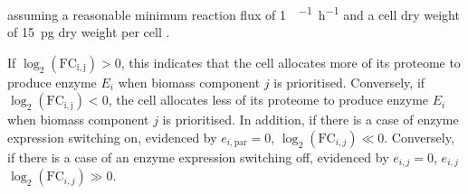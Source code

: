 assuming a reasonable minimum reaction flux of \SI{1}{\molecule~\cell^{-1}~\hour^{-1}} and a cell dry weight of \SI{15}{\pico\gram} dry weight per cell \parencite{shermanGettingStartedYeast2002}.

If $\log_{2}(\mathrm{FC_{i,j}}) > 0$, this indicates that the cell allocates more of its proteome to produce enzyme $E_{i}$ when biomass component $j$ is prioritised.
Conversely, if $\log_{2}(\mathrm{FC_{i,j}}) < 0$, the cell allocates less of its proteome to produce enzyme $E_{i}$ when biomass component $j$ is prioritised.
In addition, if there is a case of enzyme expression switching on, evidenced by $e_{i, \mathrm{par}} = 0$, $\log_{2}(\mathrm{FC}_{i,j}) \ll 0$.
Conversely, if there is a case of an enzyme expression switching off, evidenced by $e_{i, j} = 0$, $e_{i,j}$ $\log_{2}(\mathrm{FC}_{i,j}) \gg 0$.

